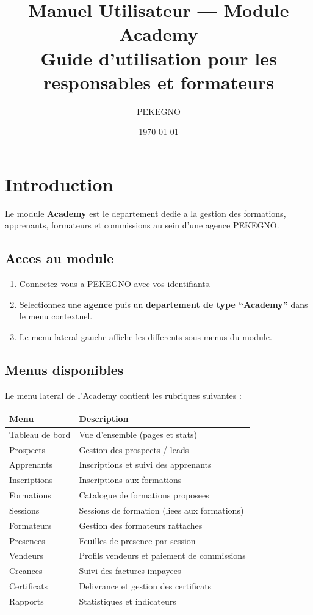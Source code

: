 \documentclass[a4paper,11pt]{article}
\title{\textbf{Manuel Utilisateur --- Module Academy} \\ \large Guide d'utilisation pour les responsables et formateurs}
\author{PEKEGNO}
\date{\today}
\newcommand{\etape}[1]{\textcolor{step}{\textbf{\'Etape :} #1}}
\begin{document}
\maketitle
\tableofcontents
\newpage

\section{Introduction}

Le module \textbf{Academy} est le departement dedie a la gestion des formations, apprenants, formateurs et commissions au sein d'une agence PEKEGNO.

\subsection{Acces au module}
\begin{enumerate}[label=\etape{\arabic*}]
  \item Connectez-vous a PEKEGNO avec vos identifiants.
  \item Selectionnez une \textbf{agence} puis un \textbf{departement de type ``Academy''} dans le menu contextuel.
  \item Le menu lateral gauche affiche les differents sous-menus du module.
\end{enumerate}

\subsection{Menus disponibles}
Le menu lateral de l'Academy contient les rubriques suivantes :

\begin{longtable}{ll}
  \toprule
  \textbf{Menu} & \textbf{Description} \\
  \midrule
  \endhead
  Tableau de bord & Vue d'ensemble (pages et stats) \\
  Prospects & Gestion des prospects / leads \\
  Apprenants & Inscriptions et suivi des apprenants \\
  Inscriptions & Inscriptions aux formations \\
  Formations & Catalogue de formations proposees \\
  Sessions & Sessions de formation (liees aux formations) \\
  Formateurs & Gestion des formateurs rattaches \\
  Presences & Feuilles de presence par session \\
  Vendeurs & Profils vendeurs et paiement de commissions \\
  Creances & Suivi des factures impayees \\
  Certificats & Delivrance et gestion des certificats \\
  Rapports & Statistiques et indicateurs \\
  \bottomrule
\end{longtable}
\end{document}
